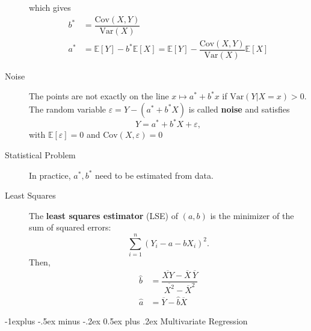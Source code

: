 \documentclass[a4paper, 10pt,landscape]{article}
\makeatletter
\newcommand{\var}{\textrm{Var}}
\newcommand{\cov}{\textrm{Cov}}
\renewcommand{\subsection}{\@startsection{subsection}{2}{0mm}%
                                {-1explus -.5ex minus -.2ex}%
                                {0.5ex plus .2ex}%
                                {\normalfont\normalsize\bfseries}}
\makeatother
\begin{document}
\begin{multicols*}{3}
\begin{description}
	which gives
	\begin{align*}
		b^* & = \dfrac{\cov\left(X,Y\right)}{\var\left(X\right)}\\
		a^* & = \mathbb{E}[Y]-b^*\mathbb{E}[X]=\mathbb{E}[Y]-\dfrac{\cov\left(X,Y\right)}{\var\left(X\right)}\mathbb{E}[X]
	\end{align*}
	\item[Noise] The points are not exactly on the line $x\mapsto a^*+b^*x$ if $\var(Y|X=x)>0$. The random variable $\varepsilon=Y-\left(a^*+b^*X\right)$ is called {\bf noise} and satisfies
	$$Y=a^*+b^*X+\varepsilon,$$
	with $\mathbb{E}[\varepsilon]=0$ and $\cov(X,\varepsilon)=0$
	\item[Statistical Problem] In practice, $a^*,b^*$ need to be estimated from data.
	\item[Least Squares] The {\bf least squares estimator} (LSE) of $(a,b)$ is the minimizer of the sum of squared errors:
	$$\sum_{i=1}^{n}\left(Y_i-a-bX_i\right)^2.$$
	Then,
	\begin{align*}
		\hat{b} & = \dfrac{\overline{XY}-\overline{X}\,\overline{Y}}{\overline{X^2}-\overline{X}^2}\\
		\hat{a} & = \overline{Y}-\hat{b}\overline{X}
	\end{align*}
\end{description}

\subsection{Multivariate Regression}


\end{multicols*}
\end{document}
